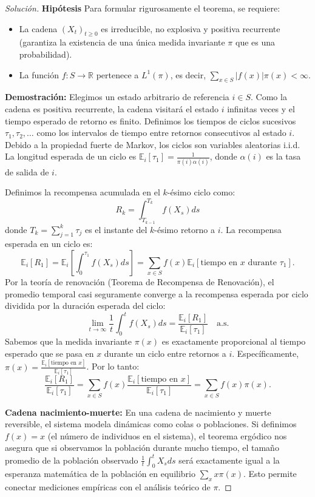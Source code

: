 \documentclass[10pt,a4paper]{article}
\begin{document}
\begin{proof}[Solución]
    \textbf{Hipótesis}
    Para formular rigurosamente el teorema, se requiere:
    \begin{itemize}
        \item La cadena $(X_t)_{t\ge 0}$ es irreducible, no explosiva y positiva recurrente (garantiza la existencia de una única medida invariante $\pi$ que es una probabilidad).
        \item La función $f: S \to \mathbb{R}$ pertenece a $L^1(\pi)$, es decir, $\sum_{x \in S} |f(x)|\pi(x) < \infty$.
    \end{itemize}

    \textbf{Demostración:}
    Elegimos un estado arbitrario de referencia $i \in S$. Como la cadena es positiva recurrente, la cadena visitará el estado $i$ infinitas veces y el tiempo esperado de retorno es finito.
    Definimos los tiempos de ciclos sucesivos $\tau_1, \tau_2, \dots$ como los intervalos de tiempo entre retornos consecutivos al estado $i$. Debido a la propiedad fuerte de Markov, los ciclos son variables aleatorias i.i.d. 
    La longitud esperada de un ciclo es $\mathbb{E}_i[\tau_1] = \frac{1}{\pi(i)\alpha(i)}$, donde $\alpha(i)$ es la tasa de salida de $i$.
    
    Definimos la recompensa acumulada en el $k$-ésimo ciclo como:
    \[ R_k = \int_{T_{k-1}}^{T_k} f(X_s) ds \]
    donde $T_k = \sum_{j=1}^k \tau_j$ es el instante del $k$-ésimo retorno a $i$.
    La recompensa esperada en un ciclo es:
    \[ \mathbb{E}_i[R_1] = \mathbb{E}_i \left[ \int_0^{\tau_1} f(X_s) ds \right] = \sum_{x \in S} f(x) \mathbb{E}_i[\text{tiempo en } x \text{ durante } \tau_1]. \]
    Por la teoría de renovación (Teorema de Recompensa de Renovación), el promedio temporal casi seguramente converge a la recompensa esperada por ciclo dividida por la duración esperada del ciclo:
    \[ \lim_{t \to \infty} \frac{1}{t} \int_0^t f(X_s) ds = \frac{\mathbb{E}_i[R_1]}{\mathbb{E}_i[\tau_1]} \quad \text{a.s.} \]
    Sabemos que la medida invariante $\pi(x)$ es exactamente proporcional al tiempo esperado que se pasa en $x$ durante un ciclo entre retornos a $i$. Específicamente, $\pi(x) = \frac{\mathbb{E}_i[\text{tiempo en } x]}{\mathbb{E}_i[\tau_1]}$.
    Por lo tanto:
    \[ \frac{\mathbb{E}_i[R_1]}{\mathbb{E}_i[\tau_1]} = \sum_{x \in S} f(x) \frac{\mathbb{E}_i[\text{tiempo en } x]}{\mathbb{E}_i[\tau_1]} = \sum_{x \in S} f(x)\pi(x). \]

    \textbf{Cadena nacimiento-muerte:}
    En una cadena de nacimiento y muerte reversible, 
    el sistema modela dinámicas como colas o poblaciones. Si definimos $f(x) = x$ (el número de individuos en el sistema), el teorema ergódico nos asegura que si observamos la población durante mucho tiempo, el tamaño promedio de la población observado $\frac{1}{t}\int_0^t X_s ds$ será exactamente igual a la esperanza matemática de la población en equilibrio $\sum_x x\pi(x)$. Esto permite conectar mediciones empíricas con el análisis teórico de $\pi$.
\end{proof}
\end{document}
